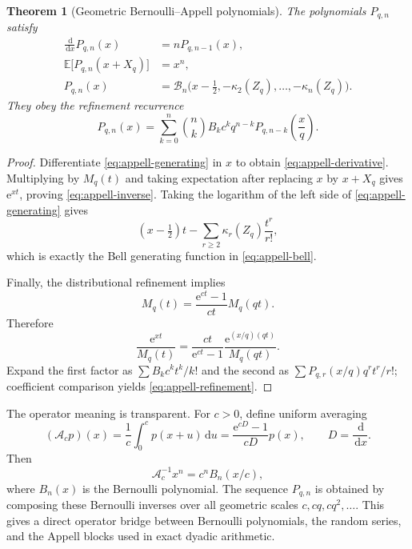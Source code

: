 \documentclass[11pt,oneside]{article}
\newtheorem{theorem}{Theorem}[section]
\theoremstyle{definition}
\theoremstyle{remark}
\newcommand{\E}{\mathbb E}
\newcommand{\e}{\mathrm e}
\newcommand{\dd}{\,\mathrm d}
\begin{document}
\begin{theorem}[Geometric Bernoulli--Appell polynomials]
\label{thm:appell}
The polynomials $P_{q,n}$ satisfy
\begin{align}
 \frac{\dd}{\dd x}P_{q,n}(x)&=nP_{q,n-1}(x),                 \label{eq:appell-derivative}\\
 \E\bigl[P_{q,n}(x+X_q)\bigr]&=x^n,                         \label{eq:appell-inverse}\\
 P_{q,n}(x)
 &=\mathcal B_n\bigl(x-\tfrac12,-\kappa_2(Z_q),\ldots,-\kappa_n(Z_q)\bigr). \label{eq:appell-bell}
\end{align}
They obey the refinement recurrence
\begin{equation}
 \boxed{\displaystyle
 P_{q,n}(x)
 =\sum_{k=0}^{n}\binom nk B_k c^k q^{n-k}
 P_{q,n-k}\!\left(\frac{x}{q}\right).}                     \label{eq:appell-refinement}
\end{equation}
\end{theorem}

\begin{proof}
Differentiate \eqref{eq:appell-generating} in $x$ to obtain
\eqref{eq:appell-derivative}.  Multiplying by $M_q(t)$ and taking expectation after replacing
$x$ by $x+X_q$ gives $\e^{xt}$, proving \eqref{eq:appell-inverse}.  Taking the logarithm of
the left side of \eqref{eq:appell-generating} gives
\[
 (x-\tfrac12)t-\sum_{r\ge2}\kappa_r(Z_q)\frac{t^r}{r!},
\]
which is exactly the Bell generating function in \eqref{eq:appell-bell}.

Finally, the distributional refinement implies
\[
 M_q(t)=\frac{\e^{ct}-1}{ct}M_q(qt).
\]
Therefore
\[
 \frac{\e^{xt}}{M_q(t)}
 =\frac{ct}{\e^{ct}-1}
  \frac{\e^{(x/q)(qt)}}{M_q(qt)}.
\]
Expand the first factor as $\sum B_kc^kt^k/k!$ and the second as
$\sum P_{q,r}(x/q)q^rt^r/r!$; coefficient comparison yields
\eqref{eq:appell-refinement}.
\end{proof}

The operator meaning is transparent.  For $c>0$, define uniform averaging
\[
 (\mathcal A_cp)(x)=\frac1c\int_0^c p(x+u)\dd u
 =\frac{\e^{cD}-1}{cD}p(x),
 \qquad D=\frac{\dd}{\dd x}.
\]
Then
\begin{equation}
 \mathcal A_c^{-1}x^n=c^nB_n(x/c),                           \label{eq:bernoulli-inverse}
\end{equation}
where $B_n(x)$ is the Bernoulli polynomial.  The sequence $P_{q,n}$ is obtained by composing
these Bernoulli inverses over all geometric scales $c,cq,cq^2,\ldots$.  This gives a direct
operator bridge between Bernoulli polynomials, the random series, and the Appell blocks used
in exact dyadic arithmetic.
\end{document}
